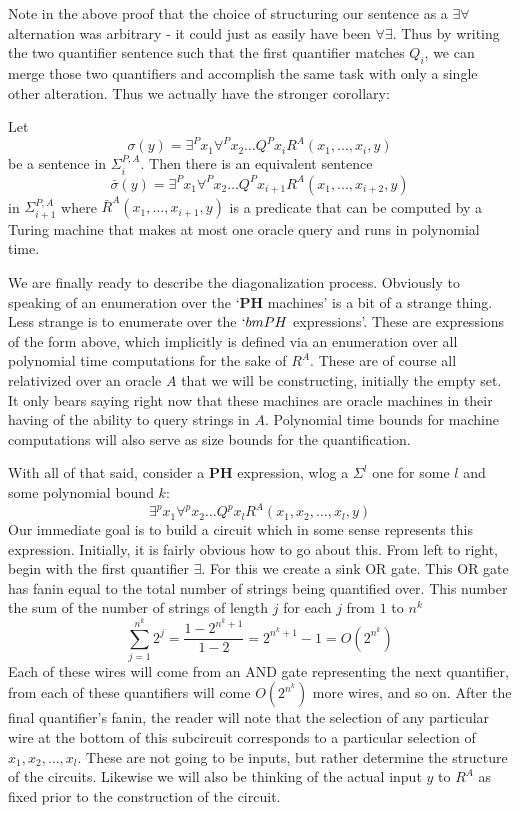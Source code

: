 Note in the above proof that the choice of structuring our sentence as a $\exists \forall$ alternation was arbitrary - it could just as easily have been $\forall \exists$. Thus by writing the two quantifier sentence such that the first quantifier matches $Q_i$, we can merge those two quantifiers and accomplish the same task with only a single other alteration. Thus we actually have the stronger corollary:
\begin{corollary}
		Let \[\sigma(y) = \exists^Px_1\forall^P x_2 \ldots Q^P x_iR^A(x_1,...,x_i,y) \]
	be a sentence in $\Sigma^{P,A}_i$. Then there is an equivalent sentence 
	\[ \bar{\sigma}(y) = \exists^Px_1\forall^P x_2 \ldots Q^P x_{i+1}R^A(x_1,...,x_{i+2},y) \]
	in $\Sigma^{P,A}_{i+1	}$ where $\bar{R}^A(x_1,...,x_{i+1},y)$ is a predicate that can be computed by a Turing machine that makes at most one oracle query and runs in polynomial time. 
\end{corollary}
We are finally ready to describe the diagonalization process. Obviously to speaking of an enumeration over the `$\bm{PH}$ machines' is a bit of a strange thing. Less strange is to enumerate over the $`bm{PH}$ expressions'. These are expressions of the form above, which implicitly is defined via an enumeration over all polynomial time computations for the sake of $R^A$. These are of course all relativized over an oracle $A$ that we will be constructing, initially the empty set. It only bears saying right now that these machines are oracle machines in their having of the ability to query strings in $A$. Polynomial time bounds for machine computations will also serve as size bounds for the quantification. \par 
With all of that said, consider a $\bm{PH}$ expression, wlog a $\Sigma^l$ one for some $l$ and some polynomial bound $k$:
\[ \exists^p x_1 \forall^p x_2 \ldots Q^p x_l R^A(x_1,x_2,\ldots,x_l,y) \]
Our immediate goal is to build a circuit which in some sense represents this expression. Initially, it is fairly obvious how to go about this. From left to right, begin with the first quantifier $\exists$. For this we create a sink OR gate. This OR gate has fanin equal to the total number of strings being quantified over. This number the sum of the number of strings of length $j$ for each $j$ from $1$ to $n^k$
\[ \sum_{j=1}^{n^k} 2^j = \frac{1-2^{n^k+1}}{1-2} = 2^{n^k+1}-1 = O(2^{n^k}) \]
Each of these wires will come from an AND gate representing the next quantifier, from each of these quantifiers will come $O(2^{n^k})$ more wires, and so on. After the final quantifier's fanin, the reader will note that the selection of any particular wire at the bottom of this subcircuit corresponds to a particular selection of $x_1,x_2,\ldots,x_l$. These are not going to be inputs, but rather determine the structure of the circuits. Likewise we will also be thinking of the actual input $y$ to $R^A$ as fixed prior to the construction of the circuit.  \par 
